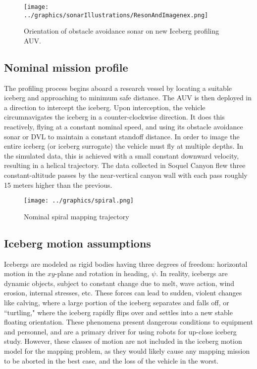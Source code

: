 \begin{figure}[htb]
   \centering
   \texttt{[image: ../graphics/sonarIllustrations/ResonAndImagenex.png]} %
   \caption{Orientation of obstacle avoidance sonar on new Iceberg profiling AUV. }
   \label{fig:ObstandMulti}
\end{figure}

\subsection{Nominal mission profile}

The profiling process begins aboard a research vessel by locating a suitable iceberg and approaching to minimum safe distance. The AUV is then deployed in a direction to intercept the iceberg. Upon interception, the vehicle circumnavigates the iceberg in a counter-clockwise direction. It does this reactively, flying at a constant nominal speed, and using its obstacle avoidance sonar or DVL to maintain a constant standoff distance. In order to image the entire iceberg (or iceberg surrogate) the vehicle must fly at multiple depths. In the simulated data, this is achieved with a small constant downward velocity, resulting in a helical trajectory. The data collected in Soquel Canyon flew three constant-altitude passes by the near-vertical canyon wall with each pass roughly 15 meters higher than the previous. 

\begin{figure}[htb]
   \centering
   \texttt{[image: ../graphics/spiral.png]} %
   \caption{Nominal spiral mapping trajectory }
   \label{fig:NominalProfile}
\end{figure}

\subsection{Iceberg motion assumptions}

Icebergs are modeled as rigid bodies having three degrees of freedom: horizontal motion in the $xy$-plane and rotation in heading, $\psi$. In reality, icebergs are dynamic objects, subject to constant change due to melt, wave action, wind erosion, internal stresses, etc. These forces can lead to sudden, violent changes like calving, where a large portion of the iceberg separates and falls off, or ``turtling," where the iceberg rapidly flips over and settles into a new stable floating orientation. These phenomena present dangerous conditions to equipment and personnel, and are a primary driver for using robots for up-close iceberg study.  However, these classes of motion are not included in the iceberg motion model for the mapping problem, as they would likely cause any mapping mission to be aborted in the best case, and the loss of the vehicle in the worst.

